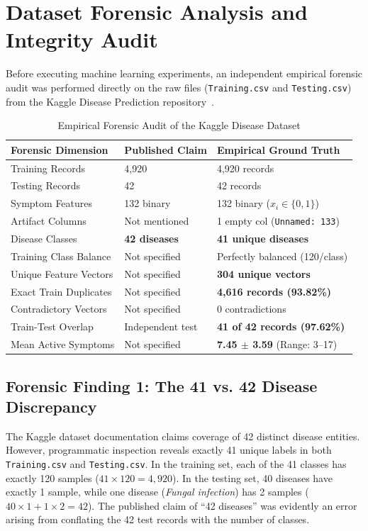 \chapter{Dataset Forensic Analysis and Integrity Audit}
\label{chap:dataset_forensics}

Before executing machine learning experiments, an independent empirical forensic audit was performed directly on the raw files (\texttt{Training.csv} and \texttt{Testing.csv}) from the Kaggle Disease Prediction repository~\cite{kaushil2020kaggle}.

\begin{table}[H]
\caption{Empirical Forensic Audit of the Kaggle Disease Dataset}
\label{tab:forensic_summary}
\centering
\begin{tabular}{lll}
\toprule
\textbf{Forensic Dimension} & \textbf{Published Claim} & \textbf{Empirical Ground Truth} \\
\midrule
Training Records & 4,920 & 4,920 records \\
Testing Records & 42 & 42 records \\
Symptom Features & 132 binary & 132 binary ($x_i \in \{0, 1\}$) \\
Artifact Columns & Not mentioned & 1 empty col (\texttt{Unnamed: 133}) \\
Disease Classes & \textbf{42 diseases} & \textbf{41 unique diseases} \\
Training Class Balance & Not specified & Perfectly balanced (120/class) \\
Unique Feature Vectors & Not specified & \textbf{304 unique vectors} \\
Exact Train Duplicates & Not specified & \textbf{4,616 records (93.82\%)} \\
Contradictory Vectors & Not specified & 0 contradictions \\
Train-Test Overlap & Independent test & \textbf{41 of 42 records (97.62\%)} \\
Mean Active Symptoms & Not specified & \textbf{7.45 $\pm$ 3.59} (Range: 3--17) \\
\bottomrule
\end{tabular}
\end{table}

\section{Forensic Finding 1: The 41 vs. 42 Disease Discrepancy}
\label{sec:forensic_finding1}
The Kaggle dataset documentation claims coverage of 42 distinct disease entities. However, programmatic inspection reveals exactly 41 unique labels in both \texttt{Training.csv} and \texttt{Testing.csv}. In the training set, each of the 41 classes has exactly 120 samples ($41 \times 120 = 4{,}920$). In the testing set, 40 diseases have exactly 1 sample, while one disease (\emph{Fungal infection}) has 2 samples ($40 \times 1 + 1 \times 2 = 42$). The published claim of ``42 diseases'' was evidently an error arising from conflating the 42 test records with the number of classes.

